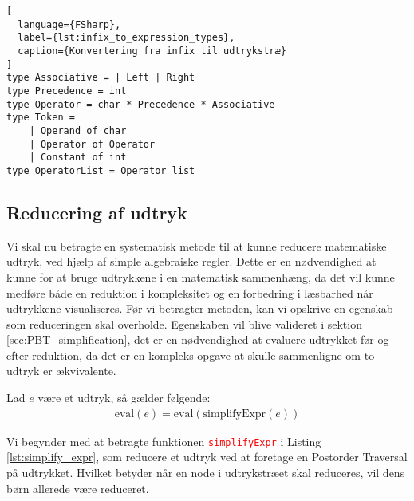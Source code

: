 \begin{lstlisting}[
  language={FSharp}, 
  label={lst:infix_to_expression_types}, 
  caption={Konvertering fra infix til udtrykstræ}
]
type Associative = | Left | Right
type Precedence = int
type Operator = char * Precedence * Associative
type Token =
    | Operand of char
    | Operator of Operator
    | Constant of int
type OperatorList = Operator list
\end{lstlisting}




\subsection{Reducering af udtryk} \label{sec:simplification_expression}
Vi skal nu betragte en systematisk metode til at kunne reducere matematiske udtryk, ved hjælp af simple algebraiske regler. Dette er en nødvendighed at kunne for at bruge udtrykkene i en matematisk sammenhæng, da det vil kunne medføre både en reduktion i kompleksitet og en forbedring i læsbarhed når udtrykkene visualiseres. Før vi betragter metoden, kan vi opskrive en egenskab som reduceringen skal overholde. Egenskaben vil blive valideret i sektion \ref{sec:PBT_simplification}, det er en nødvendighed at evaluere udtrykket før og efter reduktion, da det er en kompleks opgave at skulle sammenligne om to udtryk er ækvivalente.
\vspace{0.5cm}
\begin{egenskab}\label{egenskab:simplification}
Lad $e$ være et udtryk, så gælder følgende:
\begin{align*}
  \text{eval}(e) = \text{eval}(\text{simplifyExpr}(e))
\end{align*}
\end{egenskab}

Vi begynder med at betragte funktionen \textcolor{red}{\texttt{simplifyExpr}} i Listing \ref{lst:simplify_expr}, som reducere et udtryk ved at foretage en Postorder Traversal på udtrykket. Hvilket betyder når en node i udtrykstræet skal reduceres, vil dens børn allerede være reduceret. 

